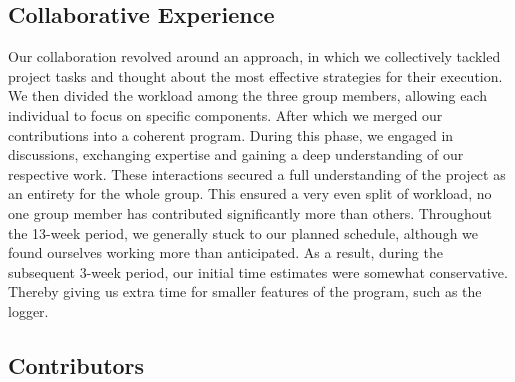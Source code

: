 \subsection{Collaborative Experience}
Our collaboration revolved around an approach, in which we collectively tackled project tasks and thought about the most effective strategies for their execution. We then divided the workload among the three group members, allowing each individual to focus on specific components.
After which we merged our contributions into a coherent program. During this phase, we engaged in discussions, exchanging expertise and gaining a deep understanding of our respective work. These interactions secured a full understanding of the project as an entirety for the whole group.
This ensured a very even split of workload, no one group member has contributed significantly more than others. 
Throughout the 13-week period, we generally stuck to our planned schedule, although we found ourselves working more than anticipated. As a result, during the subsequent 3-week period, our initial time estimates were somewhat conservative. Thereby giving us extra time for smaller features of the program, such as the logger.


\subsection{Contributors}


